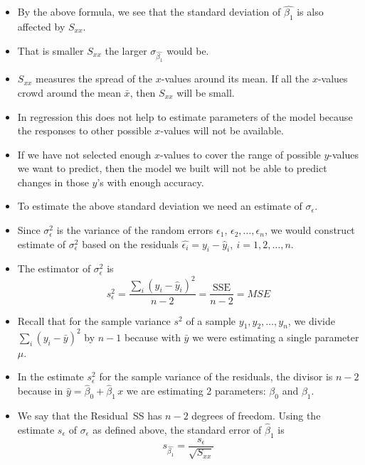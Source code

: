 \documentclass[xcolor=dvipsnames,12pt]{beamer}
\begin{document}
\begin{frame}
\begin{itemize}
\item By the above formula, we see that the  standard deviation of 
$\hat{\beta_1}$ is also affected by $S_{xx}$.
\item That is smaller  $S_{xx}$ the
larger $\sigma_{\hat{\beta_1}}$ would be.  
\item $S_{xx}$ measures the spread of the $x$-values around its mean. If all the $x$-values crowd around the mean $\bar{x}$, then  $S_{xx}$ will be small.
\item In regression this does not help to estimate parameters of the 
model because the responses to other possible $x$-values will not be available.
\item If we have not selected enough $x$-values to cover the range of possible
$y$-values we want to predict, then the model we built will not be
able to predict changes in those $y$'s with enough accuracy. 
\end{itemize}
\end{frame}


\begin{frame}
\begin{itemize}
\item To estimate the above standard deviation we need an estimate
of $\sigma_{\epsilon}$. 
\item Since $\sigma_{\epsilon}^2$ is the variance
of the random errors $\epsilon_1,\,\epsilon_2,\ldots,\epsilon_n$,
we would construct estimate of  $\sigma_{\epsilon}^2$ based on 
the residuals $\hat{\epsilon_i}=y_i - \hat{y}_i,\ 
i=1,2,\ldots,n$. 
\item The estimator of $\sigma_{\epsilon}^2$ is 
$$s_{\epsilon}^2=\frac{ \sum_i (y_i -
\hat{y}_i)^2}{n-2}=\frac{\mbox{SSE}}{n-2}=MSE$$
\end{itemize}
\end{frame}


\begin{frame}
\begin{itemize}
\item Recall that for the sample variance $s^2$ of a sample 
$y_1, y_2, \ldots, y_n$, we divide $ \sum_i (y_i -\bar{y})^2$ 
by $n-1$ because with $\bar{y}$ we were estimating a single 
parameter $\mu$. 
\item In the estimate  $ s_{\epsilon}^2$
for the sample variance of the residuals, the  divisor 
is $n-2$ because in $\hat{y}= \hat{\beta}_0 + \hat{\beta}_1\,x$ we
are estimating 2 parameters: $\beta_0$ and  $\beta_1$. 
\item We say that
the Residual~SS has $n-2$ degrees of freedom.
 Using the estimate $s_{\epsilon}$ of $\sigma_{\epsilon}$ as
defined above, the standard error of  $\hat{\beta}_1$ is
$$ s_{\hat{\beta_1}}=\frac{s_{\epsilon}}{\sqrt{S_{xx}}}$$
\end{itemize}
\end{frame}
\end{document}

